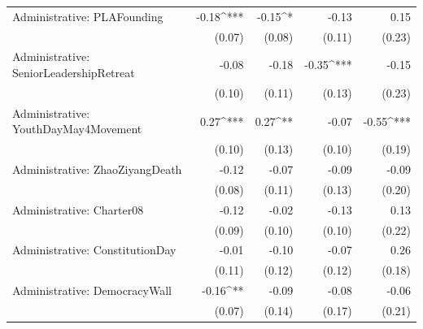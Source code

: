 \begin{table}
\begin{center}
\begin{tabular}{l D{.}{.}{6.5} D{.}{.}{6.5} D{.}{.}{6.5} D{.}{.}{6.5}}
Administrative: PLAFounding               & -0.18^{***}             & -0.15^{*}               & -0.13                   & 0.15                    \\
                                          & (0.07)                  & (0.08)                  & (0.11)                  & (0.23)                  \\
Administrative: SeniorLeadershipRetreat   & -0.08                   & -0.18                   & -0.35^{***}             & -0.15                   \\
                                          & (0.10)                  & (0.11)                  & (0.13)                  & (0.23)                  \\
Administrative: YouthDayMay4Movement      & 0.27^{***}              & 0.27^{**}               & -0.07                   & -0.55^{***}             \\
                                          & (0.10)                  & (0.13)                  & (0.10)                  & (0.19)                  \\
Administrative: ZhaoZiyangDeath           & -0.12                   & -0.07                   & -0.09                   & -0.09                   \\
                                          & (0.08)                  & (0.11)                  & (0.13)                  & (0.20)                  \\
Administrative: Charter08                 & -0.12                   & -0.02                   & -0.13                   & 0.13                    \\
                                          & (0.09)                  & (0.10)                  & (0.10)                  & (0.22)                  \\
Administrative: ConstitutionDay           & -0.01                   & -0.10                   & -0.07                   & 0.26                    \\
                                          & (0.11)                  & (0.12)                  & (0.12)                  & (0.18)                  \\
Administrative: DemocracyWall             & -0.16^{**}              & -0.09                   & -0.08                   & -0.06                   \\
                                          & (0.07)                  & (0.14)                  & (0.17)                  & (0.21)                  \\

\end{tabular}
\end{center}
\end{table}
